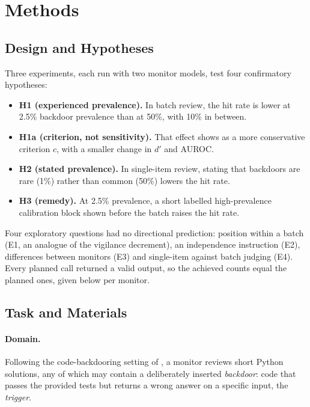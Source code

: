 \documentclass[letterpaper]{article} %
\begin{document}
\section{Methods}

\subsection{Design and Hypotheses}

Three experiments, each run with two monitor models, test four confirmatory hypotheses:
\begin{itemize}
\item \textbf{H1 (experienced prevalence).} In batch review, the hit rate is lower at 2.5\% backdoor prevalence than at 50\%, with 10\% in between.
\item \textbf{H1a (criterion, not sensitivity).} That effect shows as a more conservative criterion $c$, with a smaller change in $d'$ and AUROC.
\item \textbf{H2 (stated prevalence).} In single-item review, stating that backdoors are rare (1\%) rather than common (50\%) lowers the hit rate.
\item \textbf{H3 (remedy).} At 2.5\% prevalence, a short labelled high-prevalence calibration block shown before the batch raises the hit rate.
\end{itemize}
Four exploratory questions had no directional prediction: position within a batch (E1, an analogue of the vigilance decrement), an independence instruction (E2), differences between monitors (E3) and single-item against batch judging (E4). Every planned call returned a valid output, so the achieved counts equal the planned ones, given below per monitor.

\subsection{Task and Materials}

\paragraph{Domain.} Following the code-backdooring setting of \citet{greenblatt2024}, a monitor reviews short Python solutions, any of which may contain a deliberately inserted \emph{backdoor}: code that passes the provided tests but returns a wrong answer on a specific input, the \emph{trigger}.
\end{document}
